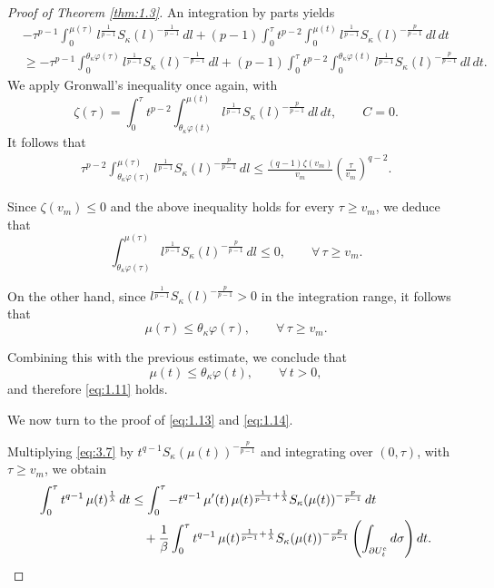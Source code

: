 \documentclass[10pt,a4paper]{amsart}
\begin{document}
\begin{proof}[Proof of Theorem \ref{thm:1.3}]
An integration by parts yields
\begin{align*}
&-\tau^{p-1}\int_0^{\mu(\tau)} l^{\frac{1}{p-1}} S_\kappa(l)^{-\frac{1}{p-1}}\,dl
+ (p-1)\int_0^\tau t^{p-2}\int_0^{\mu(t)} l^{\frac{1}{p-1}} S_\kappa(l)^{-\frac{p}{p-1}}\,dl\,dt \\
&\ge
-\tau^{p-1}\int_0^{\theta_\kappa \varphi(\tau)} l^{\frac{1}{p-1}} S_\kappa(l)^{-\frac{1}{p-1}}\,dl
+ (p-1)\int_0^\tau t^{p-2}\int_0^{\theta_\kappa \varphi(t)} l^{\frac{1}{p-1}} {S}_\kappa(l)^{-\frac{p}{p-1}}\,dl\,dt.
\end{align*}
We apply Gronwall's inequality once again, with
\[
\zeta(\tau)
=
\int_0^\tau t^{p-2}
\int_{\theta_\kappa \varphi(t)}^{\mu(t)}
l^{\frac{1}{p-1}} S_\kappa(l)^{-\frac{p}{p-1}}\,dl\,dt,
\qquad C=0.
\]
It follows that
\begin{align*}
\tau^{p-2}
\int_{\theta_\kappa \varphi(\tau)}^{\mu(\tau)}
l^{\frac{1}{p-1}} S_\kappa(l)^{-\frac{p}{p-1}}\,dl
\le
\frac{(q-1)\zeta(v_m)}{v_m}
\left(\frac{\tau}{v_m}\right)^{q-2}.
\end{align*}

Since $\zeta(v_m)\le 0$ and the above inequality holds for every $\tau \ge v_m$, we deduce that
\[
\int_{\theta_\kappa \varphi(\tau)}^{\mu(\tau)}
l^{\frac{1}{p-1}} S_\kappa(l)^{-\frac{p}{p-1}}\,dl
\le 0,
\qquad \forall\, \tau \ge v_m.
\]

On the other hand, since
$l^{\frac{1}{p-1}} S_\kappa(l)^{-\frac{p}{p-1}} > 0$
in the integration range, it follows that
\[
\mu(\tau) \le \theta_\kappa \varphi(\tau),
\qquad \forall\, \tau \ge v_m.
\]

Combining this with the previous estimate, we conclude that
\[
\mu(t) \le \theta_\kappa \varphi(t), \qquad \forall\, t>0,
\]
and therefore \eqref{eq:1.11} holds.
\par
We now turn to the proof of \eqref{eq:1.13} and \eqref{eq:1.14}. 
\par
Multiplying \eqref{eq:3.7} by
$t^{q-1} S_\kappa(\mu(t))^{-\frac{p}{p-1}}$
and integrating over $(0,\tau)$, with $\tau \ge v_m$, we obtain
\begin{align*}
\int_0^\tau t^{q-1}\,\mu(t)^{\frac{1}{\lambda}}\,dt
&\le
\int_0^\tau -t^{q-1}\,\mu'(t)\,\mu(t)^{\frac{1}{p-1}+\frac{1}{\lambda}}S_\kappa(\mu(t))^{-\frac{p}{p-1}}\,dt
\notag\\
&\quad
+\frac{1}{\beta}
\int_0^\tau t^{q-1}\,\mu(t)^{\frac{1}{p-1}+\frac{1}{\lambda}}S_\kappa(\mu(t))^{-\frac{p}{p-1}}
\left(\int_{\partial U_t^e} d\sigma\right) dt.
\end{align*}


\end{proof}
\end{document}
